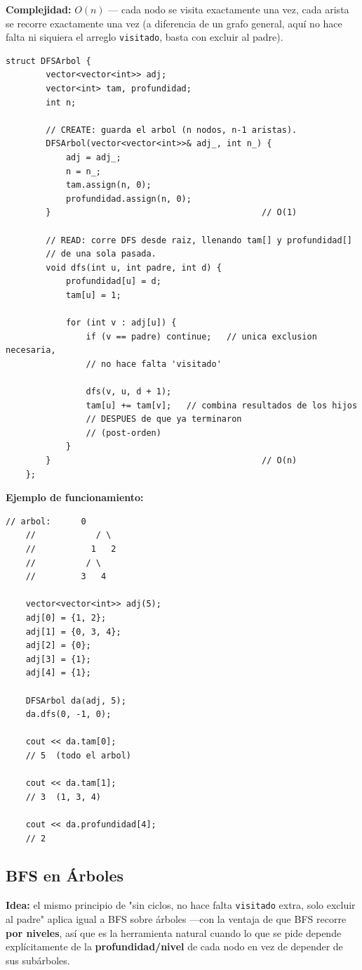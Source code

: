 \documentclass[10pt,a4paper,twocolumn]{article}
\begin{document}
\textbf{Complejidad:} $O(n)$ — cada nodo se visita exactamente una
vez, cada arista se recorre exactamente una vez (a diferencia de un
grafo general, aquí no hace falta ni siquiera el arreglo
\texttt{visitado}, basta con excluir al padre).

\begin{lstlisting}[style=cpp]
	struct DFSArbol {
		vector<vector<int>> adj;
		vector<int> tam, profundidad;
		int n;
		
		// CREATE: guarda el arbol (n nodos, n-1 aristas).
		DFSArbol(vector<vector<int>>& adj_, int n_) {
			adj = adj_;
			n = n_;
			tam.assign(n, 0);
			profundidad.assign(n, 0);
		}                                          // O(1)
		
		// READ: corre DFS desde raiz, llenando tam[] y profundidad[]
		// de una sola pasada.
		void dfs(int u, int padre, int d) {
			profundidad[u] = d;
			tam[u] = 1;
			
			for (int v : adj[u]) {
				if (v == padre) continue;   // unica exclusion necesaria,
				// no hace falta 'visitado'
				
				dfs(v, u, d + 1);
				tam[u] += tam[v];   // combina resultados de los hijos
				// DESPUES de que ya terminaron
				// (post-orden)
			}
		}                                          // O(n)
	};
\end{lstlisting}

\textbf{Ejemplo de funcionamiento:}

\begin{lstlisting}[style=cpp]
	// arbol:      0
	//            / \
	//           1   2
	//          / \
	//         3   4
	
	vector<vector<int>> adj(5);
	adj[0] = {1, 2};
	adj[1] = {0, 3, 4};
	adj[2] = {0};
	adj[3] = {1};
	adj[4] = {1};
	
	DFSArbol da(adj, 5);
	da.dfs(0, -1, 0);
	
	cout << da.tam[0];
	// 5  (todo el arbol)
	
	cout << da.tam[1];
	// 3  (1, 3, 4)
	
	cout << da.profundidad[4];
	// 2
\end{lstlisting}


\subsection{BFS en Árboles}

\textbf{Idea:} el mismo principio de "sin ciclos, no hace falta
\texttt{visitado} extra, solo excluir al padre" aplica igual a BFS
sobre árboles —con la ventaja de que BFS recorre \textbf{por
	niveles}, así que es la herramienta natural cuando lo que se pide
depende explícitamente de la \textbf{profundidad/nivel} de cada nodo
en vez de depender de sus subárboles.
\end{document}

